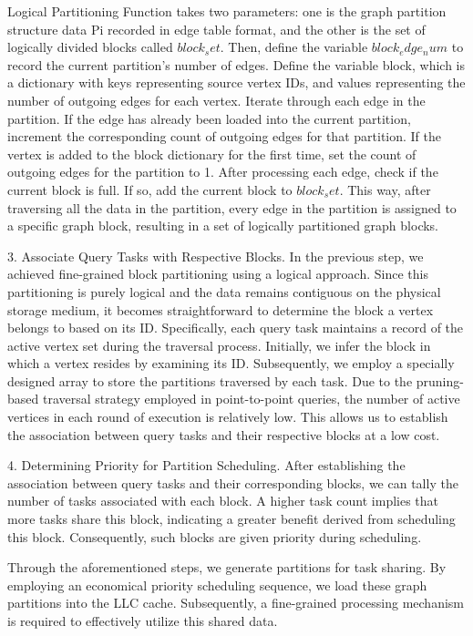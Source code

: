 \documentclass[lettersize,journal]{IEEEtran} %
\begin{document}
Logical Partitioning Function takes two parameters: one is the graph partition structure data Pi recorded in edge table format, and the other is the set of logically divided blocks called $block_set$. Then, define the variable $block_edge_num$ to record the current partition's number of edges. Define the variable block, which is a dictionary with keys representing source vertex IDs, and values representing the number of outgoing edges for each vertex. Iterate through each edge in the partition. If the edge has already been loaded into the current partition, increment the corresponding count of outgoing edges for that partition. If the vertex is added to the block dictionary for the first time, set the count of outgoing edges for the partition to 1. After processing each edge, check if the current block is full. If so, add the current block to $block_set$. This way, after traversing all the data in the partition, every edge in the partition is assigned to a specific graph block, resulting in a set of logically partitioned graph blocks.

3. Associate Query Tasks with Respective Blocks. In the previous step, we achieved fine-grained block partitioning using a logical approach. Since this partitioning is purely logical and the data remains contiguous on the physical storage medium, it becomes straightforward to determine the block a vertex belongs to based on its ID. Specifically, each query task maintains a record of the active vertex set during the traversal process. Initially, we infer the block in which a vertex resides by examining its ID. Subsequently, we employ a specially designed array to store the partitions traversed by each task. Due to the pruning-based traversal strategy employed in point-to-point queries, the number of active vertices in each round of execution is relatively low. This allows us to establish the association between query tasks and their respective blocks at a low cost.

4. Determining Priority for Partition Scheduling. After establishing the association between query tasks and their corresponding blocks, we can tally the number of tasks associated with each block. A higher task count implies that more tasks share this block, indicating a greater benefit derived from scheduling this block. Consequently, such blocks are given priority during scheduling.

Through the aforementioned steps, we generate partitions for task sharing. By employing an economical priority scheduling sequence, we load these graph partitions into the LLC cache. Subsequently, a fine-grained processing mechanism is required to effectively utilize this shared data.
\end{document}
